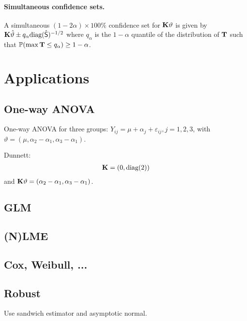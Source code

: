 \documentclass[12pt]{article}
\begin{document}
\paragraph{Simultaneous confidence sets.}

A simultaneous $(1 - 2\alpha) \times 100\%$ 
confidence set for $\mathbf{K} \vartheta$ is given by 
$\mathbf{K} \hat{\vartheta} \pm q_\alpha \text{diag}(\hat{\textsf{S}})^{-1/2}$
where $q_\alpha$ is the $1 - \alpha$ 
quantile of the distribution of $\mathbf{T}$ 
such that $\mathbb{P}(\max{\mathbf{T}} \le q_\alpha) \ge 1 - \alpha$.

\section{Applications}

\subsection{One-way ANOVA}

One-way ANOVA for three groups:
$Y_{ij} = \mu + \alpha_{j} + \varepsilon_{ij}, j = 1, 2, 3$,
with $\vartheta = (\mu, \alpha_2 - \alpha_1, \alpha_3 - \alpha_1)$.

Dunnett: 
\begin{eqnarray*}
\mathbf{K} = (0, \text{diag}(2))
\end{eqnarray*}
and $\mathbf{K} \vartheta = (\alpha_2 - \alpha_1, \alpha_3 - \alpha_1)$.

\subsection{GLM}

\subsection{(N)LME}

\subsection{Cox, Weibull, ...}

\subsection{Robust}

Use sandwich estimator and asymptotic normal.







\end{document}

